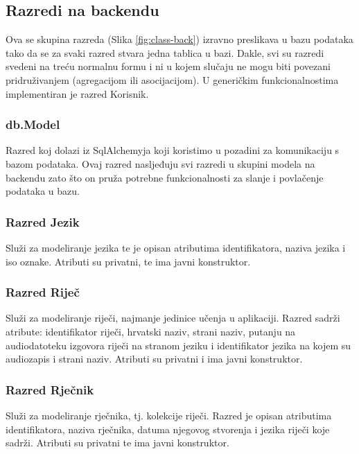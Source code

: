 \subsection{Razredi na backendu}

Ova se skupina razreda (Slika \ref{fig:class-back}) izravno preslikava u bazu podataka tako da se za svaki razred stvara jedna tablica u bazi. Dakle, svi su razredi svedeni na treću normalnu formu i ni u kojem slučaju ne mogu biti povezani pridruživanjem (agregacijom ili asocijacijom). U generičkim funkcionalnostima implementiran je razred Korisnik.

\subsubsection{db.Model}

Razred koj dolazi iz SqlAlchemyja koji koristimo u pozadini za komunikaciju s 
bazom podataka. Ovaj razred nasljeđuju svi razredi u skupini modela na backendu zato što on
pruža potrebne funkcionalnosti za slanje i povlačenje podataka u bazu.


\subsubsection{Razred Jezik}

Služi za modeliranje jezika te je opisan atributima identifikatora,
naziva jezika i iso oznake. Atributi su privatni, te ima javni konstruktor.

\subsubsection{Razred Riječ}

Služi za modeliranje riječi, najmanje jedinice učenja u aplikaciji.
Razred sadrži atribute: identifikator riječi, hrvatski naziv, strani naziv,
putanju na audiodatoteku izgovora riječi na stranom jeziku i identifikator jezika
na kojem su audiozapis i strani naziv. Atributi su privatni i ima javni konstruktor.

\subsubsection{Razred Rječnik}

Služi za modeliranje rječnika, tj. kolekcije riječi. Razred je opisan atributima identifikatora, naziva rječnika, datuma njegovog stvorenja i jezika riječi koje sadrži. Atributi su privatni te ima javni konstruktor.

